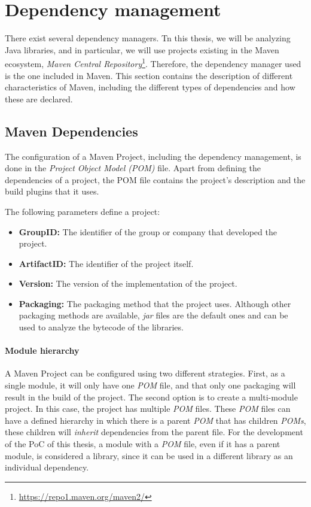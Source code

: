 \section{Dependency management}
There exist several dependency managers. Tn this thesis, we will be analyzing Java libraries, and in particular, we will use projects existing in the Maven ecosystem, \textit{Maven Central Repository}\footnote{\url{https://repo1.maven.org/maven2/}}. Therefore, the dependency manager used is the one included in Maven. This section contains the description of different characteristics of Maven, including the different types of dependencies and how these are declared.

\subsection{Maven Dependencies}
The configuration of a Maven Project, including the dependency management, is done in the \textit{Project Object Model (POM)} file. Apart from defining the dependencies of a project, the POM file contains the project's description and the build plugins that it uses.

The following parameters define a project:

\begin{itemize}
  \item \textbf{GroupID:} The identifier of the group or company that developed the project.
  \item \textbf{ArtifactID:} The identifier of the project itself.
  \item \textbf{Version:} The version of the implementation of the project.
  \item \textbf{Packaging:} The packaging method that the project uses. Although other packaging methods are available, \textit{jar} files are the default ones and can be used to analyze the bytecode of the libraries.
\end{itemize}

\paragraph{Module hierarchy}
A Maven Project can be configured using two different strategies. First, as a single module, it will only have one \textit{POM} file, and that only one packaging will result in the build of the project. The second option is to create a multi-module project. In this case, the project has multiple \textit{POM} files. These \textit{POM} files can have a defined hierarchy in which there is a parent \textit{POM} that has children \textit{POMs}, these children will \textit{inherit} dependencies from the parent file. For the development of the PoC of this thesis, a module with a \textit{POM} file, even if it has a parent module, is considered a library, since it can be used in a different library as an individual dependency.

